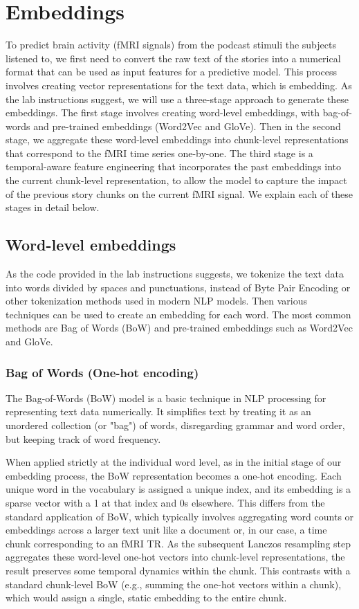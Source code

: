 \documentclass[10pt,letterpaper]{article}
\begin{document}
\section{Embeddings}
To predict brain activity (fMRI signals) from the podcast stimuli the subjects listened to, we first need to convert the raw text of the stories into a numerical format that can be used as input features for a predictive model. This process involves creating vector representations for the text data, which is embedding. As the lab instructions suggest, we will use a three-stage approach to generate these embeddings. The first stage involves creating word-level embeddings, with bag-of-words and pre-trained embeddings (Word2Vec and GloVe). Then in the second stage, we aggregate these word-level embeddings into chunk-level representations that correspond to the fMRI time series one-by-one. The third stage is a temporal-aware feature engineering that incorporates the past embeddings into the current chunk-level representation, to allow the model to capture the impact of the previous story chunks on the current fMRI signal. We explain each of these stages in detail below.

\subsection{Word-level embeddings}
As the code provided in the lab instructions suggests, we tokenize the text data into words divided by spaces and punctuations, instead of Byte Pair Encoding or other tokenization methods used in modern NLP models. Then various techniques can be used to create an embedding for each word. The most common methods are Bag of Words (BoW) and pre-trained embeddings such as Word2Vec and GloVe.

\subsubsection{Bag of Words (One-hot encoding)}
The Bag-of-Words (BoW) model is a basic technique in NLP processing for representing text data numerically. It simplifies text by treating it as an unordered collection (or "bag") of words, disregarding grammar and word order, but keeping track of word frequency.

When applied strictly at the individual word level, as in the initial stage of our embedding process, the BoW representation becomes a one-hot encoding. Each unique word in the vocabulary is assigned a unique index, and its embedding is a sparse vector with a 1 at that index and 0s elsewhere. This differs from the standard application of BoW, which typically involves aggregating word counts or embeddings across a larger text unit like a document or, in our case, a time chunk corresponding to an fMRI TR. As the subsequent Lanczos resampling step aggregates these word-level one-hot vectors into chunk-level representations, the result preserves some temporal dynamics within the chunk. This contrasts with a standard chunk-level BoW (e.g., summing the one-hot vectors within a chunk), which would assign a single, static embedding to the entire chunk.
\end{document}
